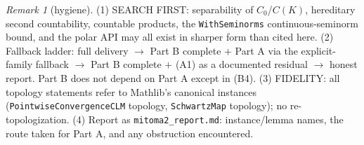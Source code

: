 \documentclass[11pt]{article}
\theoremstyle{plain}
\theoremstyle{remark}
\newtheorem{remark}{Remark}
\begin{document}
\begin{remark}[hygiene]
(1) SEARCH FIRST: separability of $C_0$/$C(K)$, hereditary second
countability, countable products, the \texttt{WithSeminorms}
continuous-seminorm bound, and the polar API may all exist in sharper form
than cited here.
(2) Fallback ladder: full delivery $\to$ Part B complete $+$ Part A via the
explicit-family fallback $\to$ Part B complete $+$ (A1) as a documented
residual $\to$ honest report. Part B does not depend on Part A except in
(B4).
(3) FIDELITY: all topology statements refer to Mathlib's canonical
instances (\texttt{PointwiseConvergenceCLM} topology, \texttt{SchwartzMap}
topology); no re-topologization.
(4) Report as \texttt{mitoma2\_report.md}: instance/lemma names, the route
taken for Part A, and any obstruction encountered.
\end{remark}
\end{document}
